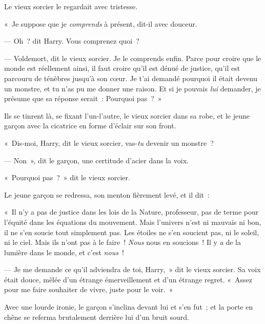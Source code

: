 Le vieux sorcier le regardait avec tristesse.

«~Je suppose que je \emph{comprends} à présent, dit-il avec douceur.

--- Oh~? dit Harry.
Vous comprenez quoi~?

--- Voldemort, dit le vieux sorcier.
Je le comprends enfin.
Parce pour croire que le monde est réellement ainsi, il faut croire qu'il est dénué de justice, qu'il est parcouru de ténèbres jusqu'à son cœur.
Je t'ai demandé pourquoi il était devenu un monstre, et tu n'as pu me donner une raison.
Et si je pouvais \emph{lui} demander, je présume que sa réponse serait~: Pourquoi pas~?~»

\later

Ils se tinrent là, se fixant l'un-l'autre, le vieux sorcier dans sa robe, et le jeune garçon avec la cicatrice en forme d'éclair sur son front.

«~Dis-moi, Harry, dit le vieux sorcier, vas-\emph{tu} devenir un monstre~?

--- Non~», dit le garçon, une certitude d'acier dans la voix.

«~Pourquoi pas~?~»
dit le vieux sorcier.

Le jeune garçon se redressa, son menton fièrement levé, et il dit~:

«~Il n'y a pas de justice dans les lois de la Nature, professeur, pas de terme pour l'équité dans les équations du mouvement.
Mais l'univers n'est ni mauvais ni bon, il ne s'en soucie tout simplement pas.
Les étoiles ne s'en soucient pas, ni le soleil, ni le ciel.
Mais ils n'ont pas à le faire~!
\emph{Nous} nous en soucions~!
Il y \emph{a} de la lumière dans le monde, et c'est \emph{nous}~!

--- Je me demande ce qu'il adviendra de toi, Harry,~» dit le vieux sorcier.
Sa voix était douce, mêlée d'un étrange émerveillement et d'un étrange regret.
«~Assez pour me faire souhaiter de vivre, juste pour le voir.~»

Avec une lourde ironie, le garçon s'inclina devant lui et s'en fut~; et la porte en chêne se referma brutalement derrière lui d'un bruit sourd.
